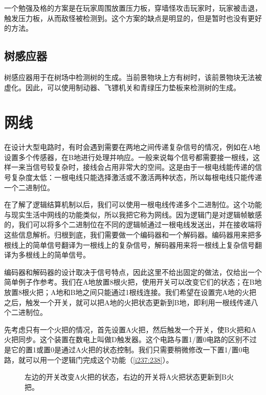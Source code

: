 一个勉强及格的方案是在玩家周围放置压力板，穿墙怪攻击玩家时，玩家被击退，触发压力板，从而敌怪被检测到。这个方案的缺点是明显的，但是暂时也没有更好的方法。

\subsection{树感应器}
树感应器用于在树场中检测树的生成。当前景物块上方有树时，该前景物块无法被虚化。因此，可以使用制动器、飞镖机关和青绿压力垫板来检测树的生成。

\section{网线}

在设计大型电路时，有时会遇到需要在两地之间传递复杂信号的情况，例如在A地设置多个传感器，在B地进行处理并响应。一般来说每个信号都需要接一根线，这样一来当信号较复杂时，接线会占用非常大的空间。这是由于一根电线能传递的信号复杂度太低：一根电线只能选择激活或不激活两种状态，所以每根电线只能传递一个二进制位。

在了解了逻辑结算机制以后，我们可以使用一根电线传递多个二进制位。这个功能与现实生活中网线的功能类似，所以我把它称为网线。因为逻辑门是对逻辑帧敏感的，我们可以将多个二进制位在不同的逻辑帧通过一根电线发送出，并在接收端将这些信息解析。归根到底，我们需要做一个编码器和一个解码器。编码器用来把多根线上的简单信号翻译为一根线上的复杂信号，解码器用来将一根线上复杂信号翻译为多根线上的简单信号。

编码器和解码器的设计取决于信号特点，因此这里不给出固定的做法，仅给出一个简单例子作参考。我们在A地放置8根火把，使用开关可以改变它们的状态；在B地放置8根火把；A地和B地之间只能通过1根线连接。我们希望在设置完A地的火把之后，触发一个开关，就可以把A地的火把状态更新到B地，即利用一根线传递八个二进制位。

先考虑只有一个火把的情况，首先设置A火把，然后触发一个开关，使B火把和A火把同步。这个装置在数电上叫做D触发器。这个电路与置1/置0电路的区别不过是它的置1或置0是通过A火把的状态控制。我们只需要稍微修改一下置1/置0电路，就可以用一个逻辑门完成这个功能（\autoref{i237:238}）。

\begin{figure}[!h]
\begin{center}
\qquad
{}
\end{center}
\caption{左边的开关改变A火把的状态，右边的开关将A火把状态更新到B火把。}
\label{i237:238}
\end{figure}

